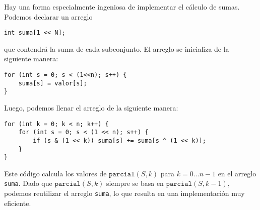 Hay una forma especialmente ingeniosa de implementar el
cálculo de sumas. Podemos declarar un arreglo
\begin{lstlisting}
int suma[1 << N];
\end{lstlisting}
que contendrá la suma de cada subconjunto.
El arreglo se inicializa de la siguiente manera:
\begin{lstlisting}
for (int s = 0; s < (1<<n); s++) {
    suma[s] = valor[s];
}
\end{lstlisting}
Luego, podemos llenar el arreglo de la siguiente manera:
\begin{lstlisting}
for (int k = 0; k < n; k++) {
    for (int s = 0; s < (1 << n); s++) {
        if (s & (1 << k)) suma[s] += suma[s ^ (1 << k)];
    }
}
\end{lstlisting}
Este código calcula los valores de $\texttt{parcial}(S,k)$
para $k=0 \ldots n-1$ en el arreglo \texttt{suma}.
Dado que $\texttt{parcial}(S,k)$ siempre se basa en
$\texttt{parcial}(S,k-1)$, podemos reutilizar el arreglo
\texttt{suma}, lo que resulta en una implementación muy eficiente.

